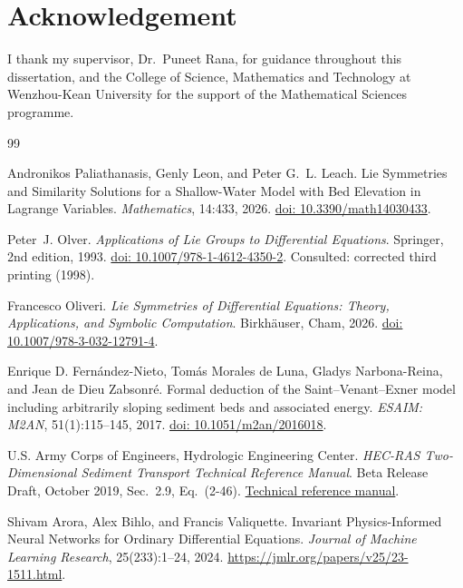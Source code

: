 \documentclass[12pt,a4paper,oneside]{report}
\numberwithin{equation}{chapter}
\theoremstyle{definition}
\theoremstyle{remark}\newtheorem{remark}[theorem]{Remark}
\newcommand{\doi}[1]{\href{https://doi.org/#1}{doi: #1}}
\begin{document}
\chapter*{Acknowledgement}
I thank my supervisor, Dr.\ Puneet Rana, for guidance throughout this dissertation, and the College of Science, Mathematics and Technology at Wenzhou-Kean University for the support of the Mathematical Sciences programme.


\begin{thebibliography}{99}

Andronikos Paliathanasis, Genly Leon, and Peter G.~L. Leach. Lie Symmetries and Similarity Solutions for a Shallow-Water Model with Bed Elevation in Lagrange Variables. \emph{Mathematics}, 14:433, 2026. \doi{10.3390/math14030433}.

Peter~J. Olver. \emph{Applications of Lie Groups to Differential Equations}. Springer, 2nd edition, 1993. \doi{10.1007/978-1-4612-4350-2}. Consulted: corrected third printing (1998).

Francesco Oliveri. \emph{Lie Symmetries of Differential Equations: Theory, Applications, and Symbolic Computation}. Birkh\"auser, Cham, 2026. \doi{10.1007/978-3-032-12791-4}.

Enrique D. Fern\'andez-Nieto, Tom\'as Morales de Luna, Gladys Narbona-Reina, and Jean de Dieu Zabsonr\'e. Formal deduction of the Saint--Venant--Exner model including arbitrarily sloping sediment beds and associated energy. \emph{ESAIM: M2AN}, 51(1):115--145, 2017. \doi{10.1051/m2an/2016018}.

U.S. Army Corps of Engineers, Hydrologic Engineering Center.
\emph{HEC-RAS Two-Dimensional Sediment Transport Technical Reference Manual}.
Beta Release Draft, October 2019, Sec.~2.9, Eq.~(2-46).
\href{https://www.hec.usace.army.mil/software/hec-ras/documentation/HEC-RAS_2DSedimentTechnicalReference_(BetaReleaseDraft).pdf}{Technical reference manual}.

Shivam Arora, Alex Bihlo, and Francis Valiquette.
Invariant Physics-Informed Neural Networks for Ordinary Differential Equations.
\emph{Journal of Machine Learning Research}, 25(233):1--24, 2024. \url{https://jmlr.org/papers/v25/23-1511.html}.


\end{thebibliography}
\end{document}
